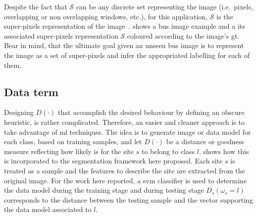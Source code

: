 Despite the fact that $\mathcal{S}$ can be any discrete set representing the image (i.e.\, pixels, overlapping or non overlapping windows, etc.), 
for this application, $\mathcal{S}$ is the super-pixels representation of the image~\cite{achanta2012slic}. 
 shows a \ac{bus} image example and a its associated super-pixels representation $\mathcal{S}$ coloured according to the image's \ac{gt}.
Bear in mind, that the ultimate goal given an unseen \ac{bus} image is to represent the image as a set of super-pixels and infer the appropriated labelling for each of them.

\subsection{Data term} \label{sec:method:dataTerm}


Designing $D(\cdot)$ that accomplish the desired behaviour by defining an obscure heuristic, is rather complicated. 
Therefore, an easier and cleaner approach is to take advantage of \ac{ml} techniques. 
The idea is to generate image or data model for each class, based on training samples, and let $D(\cdot)$ be a distance or goodness measure reflecting how likely is for the site $s$ to belong to class $l$.
 shows how this is incorporated to the segmentation framework here proposed.
Each site $s$ is treated as a sample and the features to describe the site are extracted from the original image. 
For the work here reported, a \ac{svm} classifier is used to determine the data model during the training stage and during testing stage $D_s(\omega_s=l)$ corresponds to the distance between the testing sample and the vector supporting the data model associated to $l$. 


